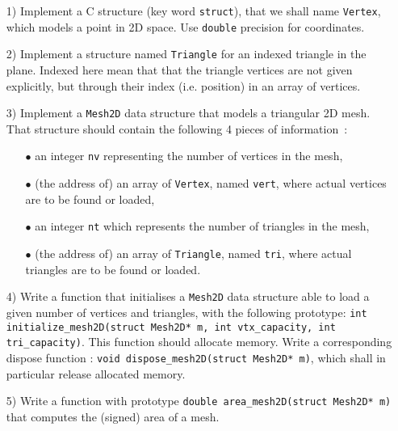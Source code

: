 \documentclass[a3paper,12pt]{article}
\begin{document}
\begin{itemize}

\item[1)] Implement a C structure (key word \texttt{struct}),
  that we shall name \texttt{Vertex}, which models a point in 2D space. Use {\tt double} precision 
  for coordinates.\\[-5pt]

\item[2)] Implement a structure named \texttt{Triangle} for an indexed triangle in the plane. Indexed here mean that   that the triangle vertices are not given explicitly, but through their index (i.e. position) in an array of vertices.\\[-5pt]

\item[3)] Implement a \texttt{Mesh2D} data structure that models a triangular 2D mesh. That structure should contain the following 4 pieces of information~:
  \begin{itemize}
  \item[$\bullet$] an integer \texttt{nv} representing the number of vertices in the mesh,
  \item[$\bullet$] (the address of) an array of {\tt Vertex}, named \texttt{vert}, where actual vertices are to be found or loaded,
  \item[$\bullet$] an integer \texttt{nt} which represents the number of triangles in the mesh,
  \item[$\bullet$] (the address of) an array of \texttt{Triangle}, named \texttt{tri}, where actual triangles are to be found or loaded.\\[-5pt]
  \end{itemize}

\item[4)] Write a function that initialises a {\tt Mesh2D} data structure able to load a given number of vertices and triangles, with the following prototype: \texttt{int initialize\_mesh2D(struct Mesh2D* m, int vtx\_capacity, int tri\_capacity)}. This function should allocate memory. Write a corresponding dispose function : \texttt{void dispose\_mesh2D(struct Mesh2D* m)}, which shall in particular release allocated memory.\\[-5pt]

\item[5)] Write a function with prototype \texttt{double area\_mesh2D(struct Mesh2D* m)} that computes the (signed) area of a mesh.


\end{itemize}
\end{document}
